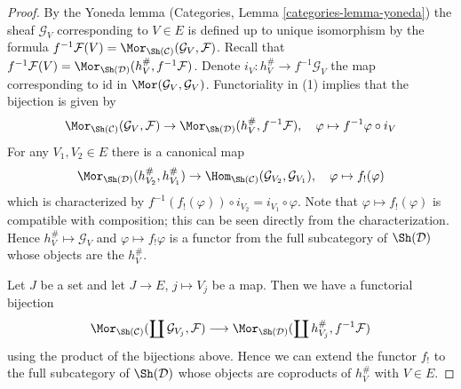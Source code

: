 \begin{proof}

By the Yoneda lemma (Categories, Lemma \ref{categories-lemma-yoneda})
the sheaf $\mathcal{G}_V$ corresponding to $V \in E$
is defined up to unique isomorphism by the formula
$f^{-1}\mathcal{F}(V) = \Mor_{\Sh(\mathcal{C})}(\mathcal{G}_V, \mathcal{F})$.
Recall that
$f^{-1}\mathcal{F}(V) = \Mor_{\Sh(\mathcal{D})}(h_V^\#, f^{-1}\mathcal{F})$.
Denote $i_V : h_V^\# \to f^{-1}\mathcal{G}_V$ the map corresponding to
$\text{id}$ in $\Mor(\mathcal{G}_V, \mathcal{G}_V)$.
Functoriality in (1) implies that the bijection is given by
$$
\Mor_{\Sh(\mathcal{C})}(\mathcal{G}_V, \mathcal{F}) \to
\Mor_{\Sh(\mathcal{D})}(h_V^\#, f^{-1}\mathcal{F}),\quad
\varphi \mapsto f^{-1}\varphi \circ i_V
$$
For any $V_1, V_2 \in E$ there is a canonical map
$$
\Mor_{\Sh(\mathcal{D})}(h^\#_{V_2}, h^\#_{V_1})
\to
\Hom_{\Sh(\mathcal{C})}(\mathcal{G}_{V_2}, \mathcal{G}_{V_1}),\quad
\varphi \mapsto f_!(\varphi)
$$
which is characterized by
$f^{-1}(f_!(\varphi)) \circ i_{V_2} = i_{V_1} \circ \varphi$.
Note that $\varphi \mapsto f_!(\varphi)$ is
compatible with composition; this can be seen directly
from the characterization. Hence $h_V^\# \mapsto \mathcal{G}_V$
and $\varphi \mapsto f_!\varphi$ is a functor from
the full subcategory of $\Sh(\mathcal{D})$ whose objects are the $h_V^\#$.

\medskip\noindent
Let $J$ be a set and let $J \to E$, $j \mapsto V_j$ be a map.
Then we have a functorial bijection
$$
\Mor_{\Sh(\mathcal{C})}(\coprod \mathcal{G}_{V_j}, \mathcal{F})
\longrightarrow
\Mor_{\Sh(\mathcal{D})}(\coprod h_{V_j}^\#, f^{-1}\mathcal{F})
$$
using the product of the bijections above. Hence we can extend the
functor $f_!$ to the full subcategory of $\Sh(\mathcal{D})$ whose
objects are coproducts of $h_V^\#$ with $V \in E$.


\end{proof}
